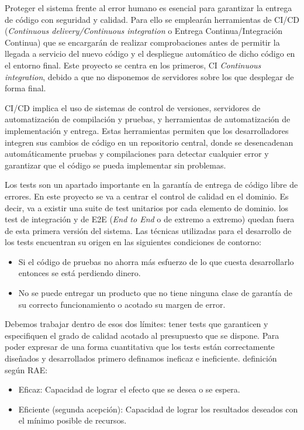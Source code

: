 
Proteger el sistema frente al error humano es esencial para garantizar la entrega de código con seguridad y calidad.
Para ello se emplearán herramientas de \gls{CI/CD} (\textit{Continuous delivery/Continuous integration} o Entrega Continua/Integración Continua) que se encargarán de realizar comprobaciones antes de permitir la llegada a servicio del nuevo código y el despliegue automático de dicho código en el entorno final.
Este proyecto se centra en los primeros, CI \textit{Continuous integration}, debido a que no disponemos de servidores sobre los que desplegar de forma final.

CI/CD implica el uso de sistemas de control de versiones, servidores de automatización de compilación y pruebas, y herramientas de automatización de implementación y entrega.
Estas herramientas permiten que los desarrolladores integren sus cambios de código en un repositorio central, donde se desencadenan automáticamente pruebas y compilaciones para detectar cualquier error y garantizar que el código se pueda implementar sin problemas.

Los tests son un apartado importante en la garantía de entrega de código libre de errores.
En este proyecto se va a centrar el control de calidad en el dominio.
Es decir, va a existir una suite de test unitarios por cada elemento de dominio.
los test de integración y de \gls{E2E} (\textit{End to End} o de extremo a extremo) quedan fuera de esta primera versión del sistema.
Las técnicas utilizadas para el desarrollo de los tests encuentran su origen en las siguientes condiciones de contorno:

\begin{itemize}
    \item Si el código de pruebas no ahorra más esfuerzo de lo que cuesta desarrollarlo entonces se está perdiendo dinero.
    \item No se puede entregar un producto que no tiene ninguna clase de garantía de su correcto funcionamiento o acotado su margen de error.
\end{itemize}

Debemos trabajar dentro de esos dos límites: tener tests que garanticen y especifiquen el grado de calidad acotado al presupuesto que se dispone.
Para poder expresar de una forma cuantitativa que los tests están correctamente diseñados y desarrollados primero definamos ineficaz e ineficiente.
definición según RAE:

\begin{itemize}
    \item Eficaz: Capacidad de lograr el efecto que se desea o se espera.
    \item Eficiente (segunda acepción): Capacidad de lograr los resultados deseados con el mínimo posible de recursos.
\end{itemize}

